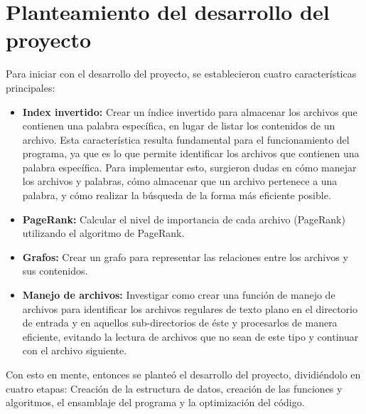 \section{Planteamiento del desarrollo del proyecto}
\rhostart{}

Para iniciar con el desarrollo del proyecto,  se establecieron cuatro características principales:

\begin{itemize}
\item \textbf{Index invertido:} Crear un índice invertido para almacenar los archivos que contienen una palabra específica, en lugar de listar los contenidos de un archivo. Esta característica resulta fundamental para el funcionamiento del programa, ya que es lo que permite identificar los archivos que contienen una palabra específica. Para implementar esto, surgieron dudas en cómo manejar los archivos y palabras, cómo almacenar que un archivo pertenece a una palabra, y cómo realizar la búsqueda de la forma más eficiente posible.
\item \textbf{PageRank:} Calcular el nivel de importancia de cada archivo (PageRank) utilizando el algoritmo de PageRank.
\item \textbf{Grafos:} Crear un grafo para representar las relaciones entre los archivos y sus contenidos.
\item \textbf{Manejo de archivos:} Investigar como crear una función de manejo de archivos para identificar los archivos regulares de texto plano en el directorio de entrada y en aquellos sub-directorios de éste y procesarlos de manera eficiente, evitando la lectura de archivos que no sean de este tipo y continuar con el archivo siguiente.
\end{itemize}

Con esto en mente, entonces se planteó el desarrollo del proyecto, dividiéndolo en cuatro etapas: Creación de la estructura de datos, creación de las funciones y algoritmos, el ensamblaje del programa y la optimización del código.